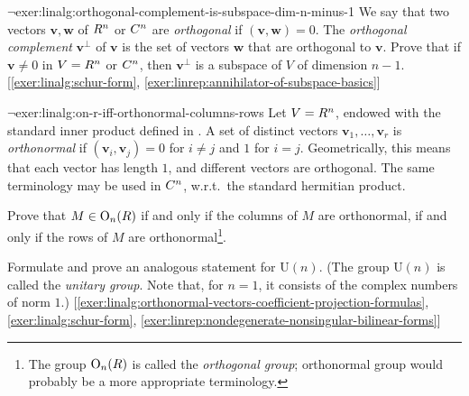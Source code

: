 \begin{exer}{$\lnot$}{exer:linalg:orthogonal-complement-is-subspace-dim-n-minus-1}
  We say that two vectors $\mathbf{v}, \mathbf{w}$ of $R^n$ or $C^n$
  are \emph{orthogonal} if $(\mathbf{v}, \mathbf{w}) = 0$.  The
  \emph{orthogonal complement} $\mathbf{v}^\perp$ of $\mathbf{v}$ is
  the set of vectors $\mathbf{w}$ that are orthogonal to $\mathbf{v}$.
  Prove that if $\mathbf{v} \neq 0$ in $V = R^n$ or $C^n$, then
  $\mathbf{v}^\perp$ is a subspace of $V$ of dimension
  $n-1$. [\ref{exer:linalg:schur-form},
  \ref{exer:linrep:annihilator-of-subspace-basics}]
\end{exer}
\begin{exer}{$\lnot$}{exer:linalg:on-r-iff-orthonormal-columns-rows}
  Let $V = R^n$, endowed with the standard inner product defined in
  . A set
  of distinct vectors $\mathbf{v}_1, \dots, \mathbf{v}_r$ is
  \emph{orthonormal} if $(\mathbf{v}_i, \mathbf{v}_j) = 0$ for
  $i \neq j$ and $1$ for $i = j$.  Geometrically, this means that each
  vector has length $1$, and different vectors are orthogonal. The
  same terminology may be used in $C^n$, w.r.t.\ the standard
  hermitian product.

  Prove that $M \in \mathrm{O}_n(R)$ if and only if the columns of
  $M$ are orthonormal, if and only if the rows of $M$ are
  orthonormal\footnote{The group $\mathrm{O}_n(R)$ is called the
    \emph{orthogonal group}; orthonormal group would probably be a
    more appropriate terminology.}.

  Formulate and prove an analogous statement for $\mathrm{U}(n)$. (The
  group $\mathrm{U}(n)$ is called the \emph{unitary group}. Note that,
  for $n = 1$, it consists of the complex numbers of norm $1$.)
  [\ref{exer:linalg:orthonormal-vectors-coefficient-projection-formulas},
  \ref{exer:linalg:schur-form},
  \ref{exer:linrep:nondegenerate-nonsingular-bilinear-forms}]
\end{exer}
